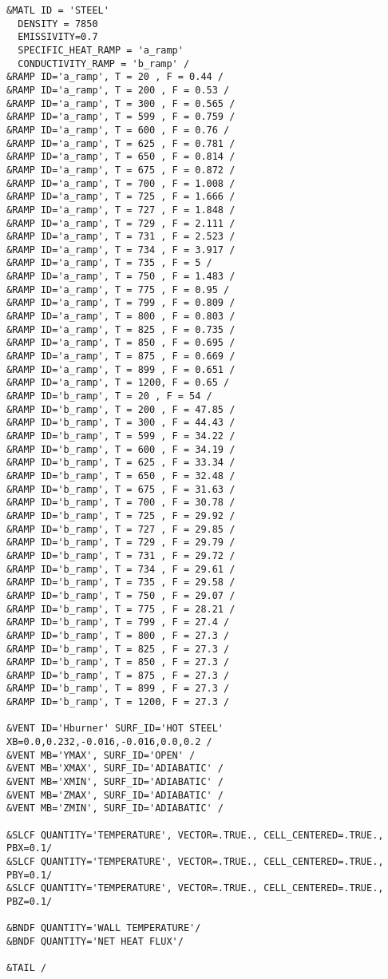 \begin{lstlisting}
&MATL ID = 'STEEL'
  DENSITY = 7850
  EMISSIVITY=0.7
  SPECIFIC_HEAT_RAMP = 'a_ramp'
  CONDUCTIVITY_RAMP = 'b_ramp' /
&RAMP ID='a_ramp', T = 20 , F = 0.44 /
&RAMP ID='a_ramp', T = 200 , F = 0.53 /
&RAMP ID='a_ramp', T = 300 , F = 0.565 /
&RAMP ID='a_ramp', T = 599 , F = 0.759 /
&RAMP ID='a_ramp', T = 600 , F = 0.76 /
&RAMP ID='a_ramp', T = 625 , F = 0.781 /
&RAMP ID='a_ramp', T = 650 , F = 0.814 /
&RAMP ID='a_ramp', T = 675 , F = 0.872 /
&RAMP ID='a_ramp', T = 700 , F = 1.008 /
&RAMP ID='a_ramp', T = 725 , F = 1.666 /
&RAMP ID='a_ramp', T = 727 , F = 1.848 /
&RAMP ID='a_ramp', T = 729 , F = 2.111 /
&RAMP ID='a_ramp', T = 731 , F = 2.523 /
&RAMP ID='a_ramp', T = 734 , F = 3.917 /
&RAMP ID='a_ramp', T = 735 , F = 5 /
&RAMP ID='a_ramp', T = 750 , F = 1.483 /
&RAMP ID='a_ramp', T = 775 , F = 0.95 /
&RAMP ID='a_ramp', T = 799 , F = 0.809 /
&RAMP ID='a_ramp', T = 800 , F = 0.803 /
&RAMP ID='a_ramp', T = 825 , F = 0.735 /
&RAMP ID='a_ramp', T = 850 , F = 0.695 /
&RAMP ID='a_ramp', T = 875 , F = 0.669 /
&RAMP ID='a_ramp', T = 899 , F = 0.651 /
&RAMP ID='a_ramp', T = 1200, F = 0.65 /
&RAMP ID='b_ramp', T = 20 , F = 54 /
&RAMP ID='b_ramp', T = 200 , F = 47.85 /
&RAMP ID='b_ramp', T = 300 , F = 44.43 /
&RAMP ID='b_ramp', T = 599 , F = 34.22 /
&RAMP ID='b_ramp', T = 600 , F = 34.19 /
&RAMP ID='b_ramp', T = 625 , F = 33.34 /
&RAMP ID='b_ramp', T = 650 , F = 32.48 /
&RAMP ID='b_ramp', T = 675 , F = 31.63 /
&RAMP ID='b_ramp', T = 700 , F = 30.78 /
&RAMP ID='b_ramp', T = 725 , F = 29.92 /
&RAMP ID='b_ramp', T = 727 , F = 29.85 /
&RAMP ID='b_ramp', T = 729 , F = 29.79 /
&RAMP ID='b_ramp', T = 731 , F = 29.72 /
&RAMP ID='b_ramp', T = 734 , F = 29.61 /
&RAMP ID='b_ramp', T = 735 , F = 29.58 /
&RAMP ID='b_ramp', T = 750 , F = 29.07 /
&RAMP ID='b_ramp', T = 775 , F = 28.21 /
&RAMP ID='b_ramp', T = 799 , F = 27.4 /
&RAMP ID='b_ramp', T = 800 , F = 27.3 /
&RAMP ID='b_ramp', T = 825 , F = 27.3 /
&RAMP ID='b_ramp', T = 850 , F = 27.3 /
&RAMP ID='b_ramp', T = 875 , F = 27.3 /
&RAMP ID='b_ramp', T = 899 , F = 27.3 /
&RAMP ID='b_ramp', T = 1200, F = 27.3 /

&VENT ID='Hburner' SURF_ID='HOT STEEL' XB=0.0,0.232,-0.016,-0.016,0.0,0.2 /
&VENT MB='YMAX', SURF_ID='OPEN' /
&VENT MB='XMAX', SURF_ID='ADIABATIC' /
&VENT MB='XMIN', SURF_ID='ADIABATIC' /
&VENT MB='ZMAX', SURF_ID='ADIABATIC' /
&VENT MB='ZMIN', SURF_ID='ADIABATIC' /

&SLCF QUANTITY='TEMPERATURE', VECTOR=.TRUE., CELL_CENTERED=.TRUE., PBX=0.1/
&SLCF QUANTITY='TEMPERATURE', VECTOR=.TRUE., CELL_CENTERED=.TRUE., PBY=0.1/
&SLCF QUANTITY='TEMPERATURE', VECTOR=.TRUE., CELL_CENTERED=.TRUE., PBZ=0.1/

&BNDF QUANTITY='WALL TEMPERATURE'/
&BNDF QUANTITY='NET HEAT FLUX'/

&TAIL /

\end{lstlisting}